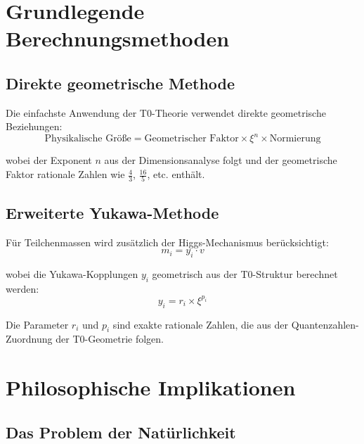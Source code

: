 	\section{Grundlegende Berechnungsmethoden}
	
	\subsection{Direkte geometrische Methode}
	
	Die einfachste Anwendung der T0-Theorie verwendet direkte geometrische Beziehungen:
	\begin{equation}
		\text{Physikalische Größe} = \text{Geometrischer Faktor} \times \xi^n \times \text{Normierung}
		\label{eq:direct_method}
	\end{equation}
	
	wobei der Exponent $n$ aus der Dimensionsanalyse folgt und der geometrische Faktor rationale Zahlen wie $\frac{4}{3}$, $\frac{16}{5}$, etc. enthält.
	
	\subsection{Erweiterte Yukawa-Methode}
	
	Für Teilchenmassen wird zusätzlich der Higgs-Mechanismus berücksichtigt:
	\begin{equation}
		m_i = y_i \cdot v
		\label{eq:yukawa_method}
	\end{equation}
	
	wobei die Yukawa-Kopplungen $y_i$ geometrisch aus der T0-Struktur berechnet werden:
	\begin{equation}
		y_i = r_i \times \xi^{p_i}
		\label{eq:yukawa_coupling}
	\end{equation}
	
	Die Parameter $r_i$ und $p_i$ sind exakte rationale Zahlen, die aus der Quantenzahlen-Zuordnung der T0-Geometrie folgen.
	
	\section{Philosophische Implikationen}
	
	\subsection{Das Problem der Natürlichkeit}
	
